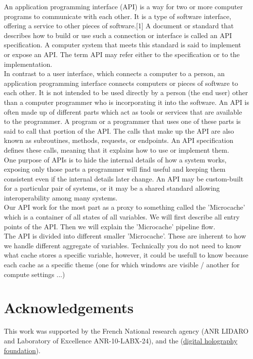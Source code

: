 \documentclass[
 reprint,
 superscriptaddress,
 amsmath,
 amssymb,
 aps,
]{revtex4-2}
\begin{document}
An application programming interface (API) is a way for two or more computer programs to communicate with each other. It is a type of software interface, offering a service to other pieces of software.[1] A document or standard that describes how to build or use such a connection or interface is called an API specification. A computer system that meets this standard is said to implement or expose an API. The term API may refer either to the specification or to the implementation.\\
In contrast to a user interface, which connects a computer to a person, an application programming interface connects computers or pieces of software to each other. It is not intended to be used directly by a person (the end user) other than a computer programmer who is incorporating it into the software. An API is often made up of different parts which act as tools or services that are available to the programmer. A program or a programmer that uses one of these parts is said to call that portion of the API. The calls that make up the API are also known as subroutines, methods, requests, or endpoints. An API specification defines these calls, meaning that it explains how to use or implement them.\\
One purpose of APIs is to hide the internal details of how a system works, exposing only those parts a programmer will find useful and keeping them consistent even if the internal details later change. An API may be custom-built for a particular pair of systems, or it may be a shared standard allowing interoperability among many systems.\\
Our API work for the most part as a proxy to something called the 'Microcache' which is a container of all states of all variables. We will first describe all entry points of the API. Then we will explain the 'Microcache' pipeline flow.\\
The API is divided into different smaller 'Microcache'. These are inherent to how we handle different aggregate of variables. Technically you do not need to know what cache stores a specific variable, however, it could be usefull to know because each cache as a specific theme (one for which windows are visible / another for compute settings ...) 

\section{Acknowledgements}

This work was supported by the French National research agency (ANR LIDARO and Laboratory of Excellence ANR-10-LABX-24), and the (\href{http://www.digitalholography.org}{digital holography foundation}).\\




\end{document}
